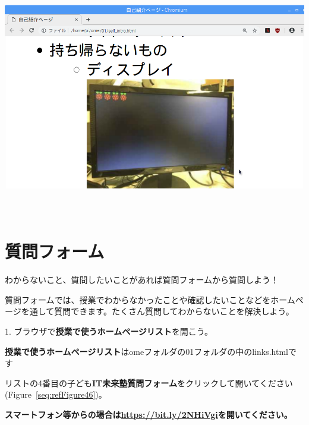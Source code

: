 \documentclass[a4paper,12pt]{jarticle}
\newcounter{Figure}
\begin{document}
\bigskip

\centering
\includegraphics[width=17.006cm,height=10.44cm]{textbook-img244.png}
\flushleft

\bigskip

\clearpage\section{質問フォーム}
わからないこと、質問したいことがあれば質問フォームから質問しよう！

質問フォームでは、授業でわからなかったことや確認したいことなどをホームページを通して質問できます。たくさん質問してわからないことを解決しよう。

1.
ブラウザで\textbf{授業で使うホームページリスト}を開こう。

\textbf{授業で使うホームページリスト}はomeフォルダの01フォルダの中のlinks.htmlです

リストの4番目の子ども\textbf{IT未来塾質問フォーム}をクリックして開いてください(Figure~\ref{seq:refFigure46})。


\bigskip

{\bfseries
スマートフォン等からの場合は\url{https://bit.ly/2NHiVgi}を開いてください。}
\end{document}
